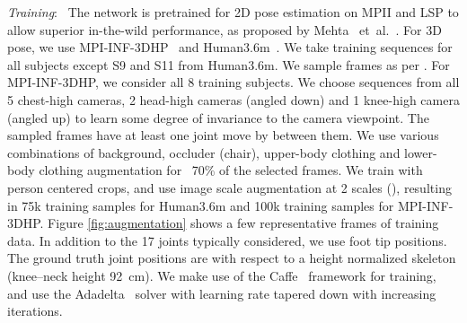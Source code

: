 \documentclass[acmtog]{acmart}
\newcommand{\parahead}[1]{\vspace{5pt}\noindent\emph{#1}:\ }
\newcommand{\etal}{~et~al.\ }
\begin{document}
\parahead{Training}
The network is pretrained for 2D pose estimation on MPII \cite{andriluka_mpii2d_cvpr14} and LSP \cite{johnson_lsp_bmvc10,johnson_lspet_cvpr11} to allow superior in-the-wild performance, as proposed by Mehta \etal \cite{mehta_mlc3d_arxiv16}. For 3D pose, we use MPI-INF-3DHP~\cite{mehta_mlc3d_arxiv16} and Human3.6m~\cite{ionescu_human36_pami14}. We take training sequences for all subjects except S9 and S11 from Human3.6m. We sample frames as per \cite{ionescu_iterated_cvpr14}. For MPI-INF-3DHP, we consider all 8 training subjects. We choose sequences from all 5 chest-high cameras, 2 head-high cameras (angled down) and 1 knee-high camera (angled up) to learn some degree of invariance to the camera viewpoint. The sampled frames have at least one joint move by  between them. We use various combinations of background, occluder (chair), upper-body clothing and lower-body clothing augmentation for ~70\% of the selected frames. We train with person centered crops, and use image scale augmentation at 2 scales (), resulting in 75k training samples for Human3.6m and 100k training samples for MPI-INF-3DHP. Figure \ref{fig:augmentation} shows a few representative frames of training data.
In addition to the 17 joints typically considered, we use foot tip positions. The ground truth joint positions are with respect to a height normalized skeleton (knee--neck height 92~cm). We make use of the Caffe~ framework for training, and use the Adadelta~\cite{zeiler2012adadelta} solver with learning rate tapered down with increasing iterations. 
\end{document}
